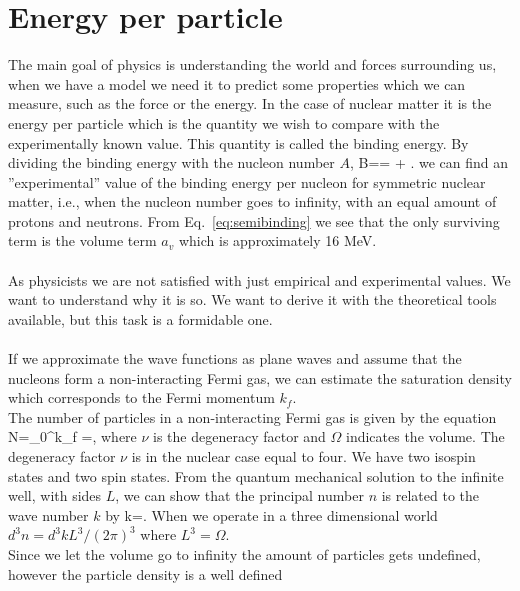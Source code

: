 
\section{Energy per particle}

The main goal of physics is understanding the world and forces surrounding us,
when we have a model we need it to predict some properties which we can
measure, such as the force or the energy. 
In the case of nuclear matter it is the
energy per particle which is the quantity we wish to compare with
the experimentally known value. This quantity is called the
binding energy. By dividing the binding energy with the nucleon number $A$,  
\be
B==  + .
\ee 
we can find an ''experimental'' value of the binding energy per nucleon
for symmetric nuclear matter, i.e., when the nucleon number  goes to infinity,
with an equal amount of protons and neutrons.  
From Eq.~\eqref{eq:semibinding} we see that the only surviving term is the volume term $a_v$ which is approximately 16 MeV.\\
\\
As physicists we are not satisfied with just empirical and experimental values.
We want  to understand why it is so. We want to derive it with the theoretical
tools available, but this task is a formidable one.\\
\\
If we approximate the wave functions as plane waves and assume that the 
nucleons form a non-interacting Fermi gas, we can estimate the saturation density which corresponds to the Fermi momentum $k_f$.
\\
The number of particles in a non-interacting Fermi gas is given by the equation
\be
N=\nu \int_0^{k_f}\Omega {} =\Omega  \nu {},
\label{Eq:nr_partic}
\ee 
where $\nu$ is the degeneracy factor and $\Omega$ indicates the volume. The degeneracy factor $\nu$ is in the nuclear case equal to four. We have two isospin states and two spin states. From the quantum mechanical solution to 
the infinite well, with sides $L$, we can show that the principal number $n$ is related to the wave number $ k $ by 
\be
k=.
\ee
When we operate in a three dimensional world $ d^3n=d^3k L^3/(2\pi)^3$ where $ L^3=\Omega$.\\
Since we let the volume go to infinity the amount of particles gets undefined, however the particle density is a well defined

